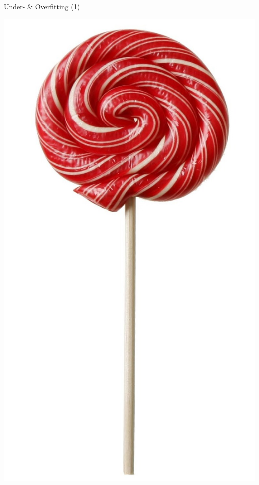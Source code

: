 \begin{frame}{Under- \& Overfitting (1)}
\begin{center}
\includegraphics[height=0.9\textheight]{src/lollibunt}
\end{center}


\end{frame}





